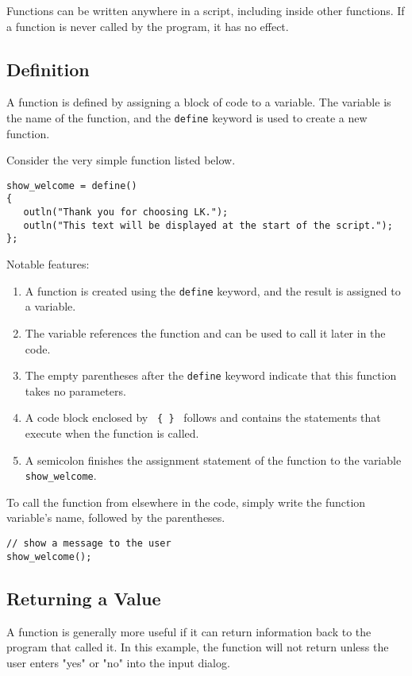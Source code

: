 \documentclass{article}
\begin{document}
Functions can be written anywhere in a script, including inside other functions.  If a function is never called by the program, it has no effect.

\subsection{Definition}

A function is defined by assigning a block of code to a variable.  The variable is the name of the function, and the \texttt{define} keyword is used to create a new function.

Consider the very simple function listed below.

\begin{verbatim}
show_welcome = define()
{
   outln("Thank you for choosing LK.");
   outln("This text will be displayed at the start of the script.");
};
\end{verbatim}

Notable features:
\begin{enumerate}
\item A function is created using the \texttt{define} keyword, and the result is assigned to a variable.
\item The variable references the function and can be used to call it later in the code.
\item The empty parentheses after the \texttt{define} keyword indicate that this function takes no parameters.
\item A code block enclosed by \texttt{ \{ \} } follows and contains the statements that execute when the function is called.
\item A semicolon finishes the assignment statement of the function to the variable \texttt{show\_welcome}.
\end{enumerate}

To call the function from elsewhere in the code, simply write the function variable's name, followed by the parentheses.  

\begin{verbatim}
// show a message to the user
show_welcome();
\end{verbatim}

\subsection{Returning a Value}

A function is generally more useful if it can return information back to the program that called it.  In this example, the function will not return unless the user enters "yes" or "no" into the input dialog.
\end{document}
